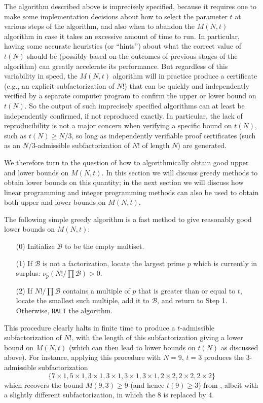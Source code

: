 \documentclass[12pt,a4paper,reqno]{amsart}
\numberwithin{equation}{section}
\theoremstyle{plain}
\theoremstyle{definition}
\newcommand\tuple{{\mathcal B}}
\begin{document}
The algorithm described above is imprecisely specified, because it requires one to make some implementation decisions about how to select the parameter $t$ at various steps of the algorithm, and also when to abandon the $M(N,t)$ algorithm in case it takes an excessive amount of time to run.  In particular, having some accurate heuristics (or ``hints'') about what the correct value of $t(N)$ should be (possibly based on the outcomes of previous stages of the algorithm) can greatly accelerate its performance.  But regardless of this variability in speed, the $M(N,t)$ algorithm will in practice produce a certificate (e.g., an explicit subfactorization of $N!$) that can be quickly and independently verified by a separate computer program to confirm the upper or lower bound on $t(N)$.  So the output of such imprecisely specified algorithms can at least be independently confirmed, if not reproduced exactly.  In particular, the lack of reproducibility is not a major concern when verifying a specific bound on $t(N)$, such as $t(N) \geq N/3$, so long as independently verifiable proof certificates (such as an $N/3$-admissible subfactorization of $N!$ of length $N$) are generated.

We therefore turn to the question of how to algorithmically obtain good upper and lower bounds on $M(N,t)$.  In this section we will discuss greedy methods to obtain lower bounds on this quantity; in the next section we will discuss how linear programming and integer programming methods can also be used to obtain both upper and lower bounds on $M(N,t)$.

The following simple greedy algorithm is a fast method to give reasonably good lower bounds on $M(N,t)$:

\begin{enumerate}
\item[(0)] Initialize $\tuple$ to be the empty multiset. 
\item[(1)] If $\tuple$ is not a factorization, locate the largest prime $p$ which is currently in surplus: $\nu_p(N!/\prod \tuple) > 0$. 
\item[(2)] If $N! / \prod \tuple$ contains a multiple of $p$ that is greater than or equal to $t$, locate the smallest such multiple, add it to $\tuple$, and return to Step 1.  Otherwise, \texttt{HALT} the algorithm. 
\end{enumerate}

This procedure clearly halts in finite time to produce a $t$-admissible subfactorization of $N!$, with the length of this subfactorization giving a lower bound on $M(N,t)$ (which can then lead to lower bounds on $t(N)$ as discussed above).  For instance, applying this procedure with $N=9$, $t=3$ produces the $3$-admissible subfactorization
$$ \{7 \times 1, 5 \times 1, 3 \times 1, 3 \times 1, 3 \times 1, 3 \times 1, 2 \times 2, 2 \times 2, 2 \times 2 \}$$
which recovers the bound $M(9,3) \geq 9$ (and hence $t(9) \geq 3$) from , albeit with a slightly different subfactorization, in which the $8$ is replaced by $4$.
\end{document}
